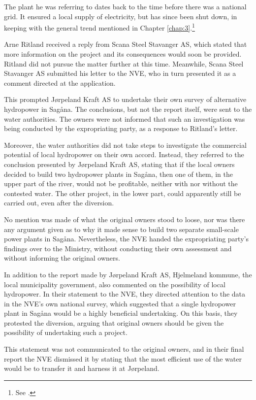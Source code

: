 The plant he was referring to dates back to the time before there was a national grid. It ensured a local supply of electricity, but has since been shut down, in keeping with the general trend mentioned in Chapter \ref{chap:3}.\footnote{See \cite{jorpeland09}.}

Arne Ritland received a reply from Scana Steel Stavanger AS, which stated that more information on the project and its consequences would soon be provided. Ritland did not pursue the matter further at this time. Meanwhile, Scana Steel Stavanger AS submitted his letter to the NVE, who in turn presented it as a comment directed at the application. 

This prompted Jørpeland Kraft AS to undertake their own survey of alternative hydropower in Sagåna. The conclusions, but not the report itself, were sent to the water authorities. The owners were not informed that such an investigation was being conducted by the expropriating party, as a response to Ritland's letter.

Moreover, the water authorities did not take steps to investigate the commercial potential of local hydropower on their own accord. Instead, they referred to the conclusion presented by Jørpeland Kraft AS, stating that if the local owners decided to build two hydropower plants in Sagåna, then one of them, in the upper part of the river, would not be profitable, neither with nor without the contested water. The other project, in the lower part, could apparently still be carried out, even after the diversion. 

No mention was made of what the original owners stood to loose, nor was there any argument given as to why it made sense to build two separate small-scale power plants in Sagåna. Nevertheless, the NVE handed the expropriating party's findings over to the Ministry, without conducting their own assessment and without informing the original owners.

In addition to the report made by Jørpeland Kraft AS, Hjelmeland kommune, the local municipality government, also commented on the possibility of local hydropower. In their statement to the NVE, they directed attention to the data in the NVE's own national survey, which suggested that a single hydropower plant in Sagåna would be a highly beneficial undertaking. On this basis, they protested the diversion, arguing that original owners should be given the possibility of undertaking such a project. 

This statement was not communicated to the original owners, and in their final report the NVE dismissed it by stating that the most efficient use of the water would be to transfer it and harness it at Jørpeland.

